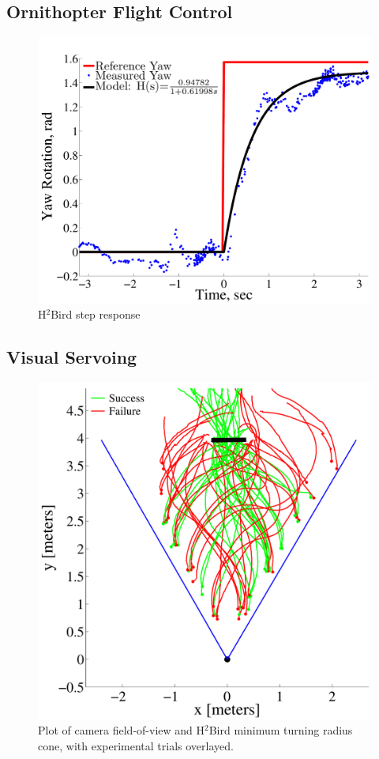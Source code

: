 \documentclass[letterpaper, 10 pt, conference]{ieeeconf}
\begin{document}
\subsection{Ornithopter Flight Control}
\begin{figure}[tb]
\centering
\includegraphics[width=\linewidth]{figures/step_response_total.pdf}
\caption{H$^2$Bird step response}
\label{fig:step_response}
\end{figure}

\subsection{Visual Servoing}

\begin{figure}[tb]
\centering
\includegraphics[width=\linewidth]{figures/flight_paths.pdf}
\caption{Plot of camera field-of-view and H$^2$Bird minimum turning radius cone, with experimental trials overlayed.}
\label{fig:flight_paths}
\end{figure}
\end{document}
